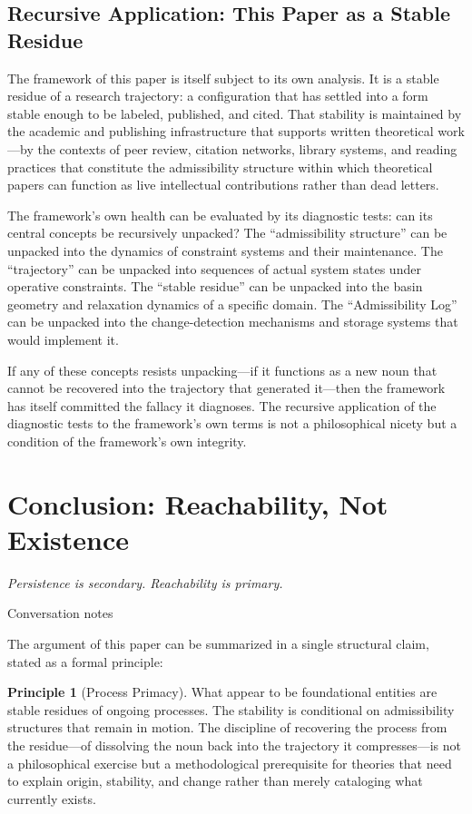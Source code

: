 \documentclass[12pt, a4paper]{article}
\theoremstyle{plain}
\theoremstyle{definition}
\newtheorem{principle}[theorem]{Principle}
\theoremstyle{remark}
\begin{document}
\subsection{Recursive Application: This Paper as a Stable Residue}

The framework of this paper is itself subject to its own analysis. It is a
stable residue of a research trajectory: a configuration that has settled
into a form stable enough to be labeled, published, and cited. That stability
is maintained by the academic and publishing infrastructure that supports
written theoretical work---by the contexts of peer review, citation networks,
library systems, and reading practices that constitute the admissibility
structure within which theoretical papers can function as live intellectual
contributions rather than dead letters.

The framework's own health can be evaluated by its diagnostic tests: can its
central concepts be recursively unpacked? The ``admissibility structure'' can
be unpacked into the dynamics of constraint systems and their maintenance.
The ``trajectory'' can be unpacked into sequences of actual system states
under operative constraints. The ``stable residue'' can be unpacked into
the basin geometry and relaxation dynamics of a specific domain. The
``Admissibility Log'' can be unpacked into the change-detection mechanisms
and storage systems that would implement it.

If any of these concepts resists unpacking---if it functions as a new noun
that cannot be recovered into the trajectory that generated it---then the
framework has itself committed the fallacy it diagnoses. The recursive
application of the diagnostic tests to the framework's own terms is not
a philosophical nicety but a condition of the framework's own integrity.

\section{Conclusion: Reachability, Not Existence}

\epigraph{\textit{Persistence is secondary. Reachability is primary.}}{Conversation notes}

\noindent
The argument of this paper can be summarized in a single structural claim,
stated as a formal principle:

\begin{principle}[Process Primacy]
\label{prin:primacy}
What appear to be foundational entities are stable residues of ongoing
processes. The stability is conditional on admissibility structures that
remain in motion. The discipline of recovering the process from the
residue---of dissolving the noun back into the trajectory it compresses---is
not a philosophical exercise but a methodological prerequisite for theories
that need to explain origin, stability, and change rather than merely
cataloging what currently exists.
\end{principle}
\end{document}
